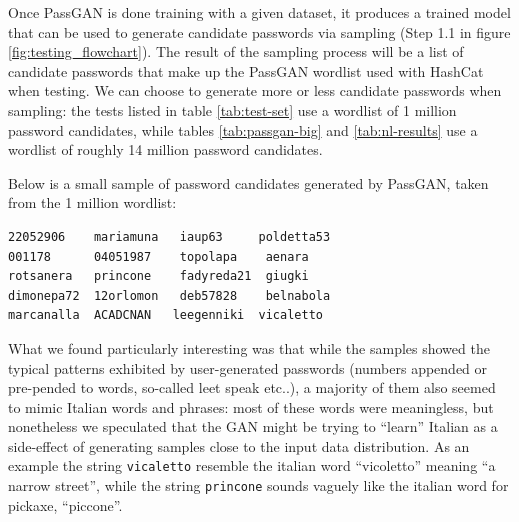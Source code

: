 Once PassGAN is done training with a given dataset, it produces a trained model that can be used to generate candidate passwords via sampling (Step 1.1 in figure \ref{fig:testing_flowchart}). The result of the sampling process will be a list of candidate passwords that make up the PassGAN wordlist used with HashCat when testing. We can choose to generate more or less candidate passwords when sampling: the tests listed in table \ref{tab:test-set} use a wordlist of 1 million password candidates, while tables \ref{tab:passgan-big} and \ref{tab:nl-results} use a wordlist of roughly 14 million password candidates.




Below is a small sample of password candidates generated by PassGAN, taken from the 1 million wordlist: %
\begin{verbatim}
22052906    mariamuna   iaup63     poldetta53
001178      04051987    topolapa    aenara
rotsanera   princone    fadyreda21  giugki
dimonepa72  12orlomon   deb57828    belnabola
marcanalla  ACADCNAN   leegenniki  vicaletto
\end{verbatim}

What we found particularly interesting was that while the samples showed the typical patterns exhibited by user-generated passwords (numbers appended or pre-pended to words, so-called leet speak etc..), a majority of them also seemed to mimic Italian words and phrases: most of these words were meaningless, but nonetheless we speculated that the GAN might be trying to \enquote{learn} Italian as a side-effect of generating samples close to the input data distribution.
As an example the string \texttt{vicaletto} resemble the italian word \enquote{vicoletto} meaning \enquote{a narrow street}, while the string \texttt{princone} sounds vaguely like the italian word for pickaxe, \enquote{piccone}. 

